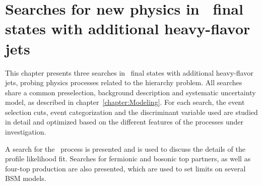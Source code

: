 \chapter{\texorpdfstring{Searches for new physics in \ttbar\ final states with additional heavy-flavor jets}{Searches for new physics in tt final states with additional heavy-flavor jets}}
\label{chapter:Analysis}

This chapter presents three searches in \ttbar\ final states with additional heavy-flavor jets, probing physics processes related to the hierarchy problem. All searches share a common preselection, background description and systematic uncertainty model, as described in chapter~\ref{chapter:Modeling}. 
For each search, the event selection cuts, event categorization and the discriminant variable used are studied in detail and optimized based on the different features of the processes under investigation.

A search for the \ttH\ process is presented and is used to discuss the details of the profile likelihood fit. Searches for fermionic and bosonic top partners, as well as four-top production are also presented, which are used to set limits on several BSM models.





